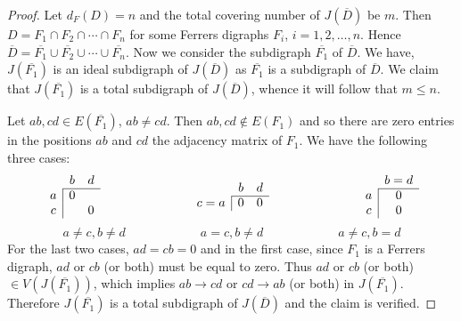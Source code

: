 \documentclass[11pt]{article}
\theoremstyle{definition}
\theoremstyle{remark}
\numberwithin{equation}{section}
\begin{document}
\begin{proof}
Let $d_F(D)=n$ and the total covering number of $J(\overline D)$ be $m$. Then $D = F_1 \cap F_2 \cap \cdots \cap F_n$ for some Ferrers digraphs $F_i$, $i = 1, 2, \ldots , n$. Hence $\overline D = \overline {F_1} \cup \overline {F_2} \cup \cdots \cup \overline {F_n}$. Now we consider the subdigraph $\overline {F_1}$ of $\overline D$. We have, $J(\overline {F_1})$ is an ideal subdigraph of $J(\overline D)$ as $\overline{F_1}$ is a subdigraph of $\overline D$. We claim that $J(\overline {F_1})$ is a total subdigraph of $J(\overline D)$, whence it will follow that $m \leq n$.

\vspace{1em}Let $ab, cd \in E(\overline {F_1})$, $ab \neq cd$. Then $ab, cd \notin E(F_1)$ and so there are zero entries in the positions $ab$ and $cd$ the adjacency matrix of $F_1$. We have the following three cases:
$$\begin{array}{c|cc}
\multicolumn{1}{c}{} & b & d \\ \cline{2-3}
a & 0  &   \\
c &    &  0
\end{array} \hspace{1in}
\begin{array}{c|cc}
\multicolumn{1}{c}{} & b & d \\ \cline{2-3}
c=a & 0  &  0
\end{array} \hspace{1in}
\begin{array}{c|c}
\multicolumn{1}{c}{} & b = d \\ \cline{2-2}
a & 0 \\
c & 0
\end{array}$$
$$a \neq c, b \neq d
\hspace{1in} a = c, b \neq d
\hspace{1in} a \neq c, b = d$$
For the last two cases, $ad=cb=0$ and in the first case, since $F_1$ is a Ferrers digraph, $ad$ or $cb$ (or both) must be equal to zero. Thus $ad$ or $cb$ (or both) $\in V(J(\overline{F_1}))$, which implies $ab \rightarrow cd$ or $cd \rightarrow ab$ (or both) in $J(\overline {F_1})$. Therefore $J(\overline {F_1})$ is a total subdigraph of $J(\overline D)$ and the claim is verified.


\end{proof}
\end{document}
